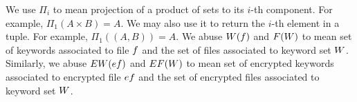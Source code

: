 We use $\Pi_i$ to mean projection of a product of sets to its $i$-th component. For example, $\Pi_1(A \times B) = A$. We may also use it to return the $i$-th element in a tuple. For example, $\Pi_1((A, B)) = A$.  We abuse $W(f)$ and $F(W)$ to mean set of keywords associated to file $f$ and the set of files associated to keyword set $W$. Similarly, we abuse $EW(ef)$ and $EF(W)$ to mean set of encrypted keywords associated to encrypted file $ef$ and the set of encrypted files associated to keyword set $W$.